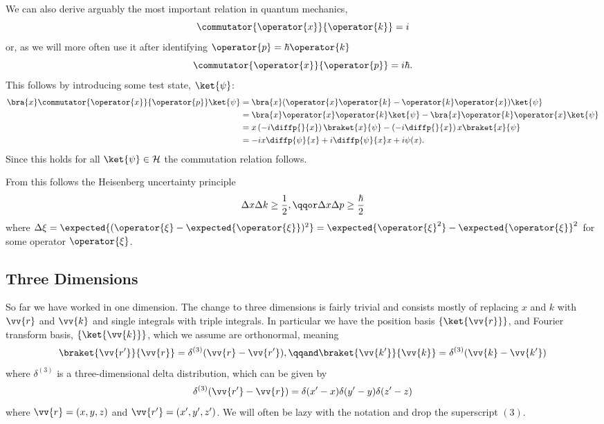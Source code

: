 \documentclass[fleqn]{NotesClass}
\newcommand*{\hilbert}{\mathcal{H}}
\begin{document}
    We can also derive arguably the most important relation in quantum mechanics,
    \begin{equation}
        \commutator{\operator{x}}{\operator{k}} = i
    \end{equation}
    or, as we will more often use it after identifying \(\operator{p} = \hbar\operator{k}\)
    \begin{equation}
        \commutator{\operator{x}}{\operator{p}} = i\hbar.
    \end{equation}
    This follows by introducing some test state, \(\ket{\psi}\):
    \begin{align}
        \bra{x}\commutator{\operator{x}}{\operator{p}}\ket{\psi} &= \bra{x}(\operator{x}\operator{k} - \operator{k}\operator{x})\ket{\psi}\\
        &= \bra{x}\operator{x}\operator{k}\ket{\psi} - \bra{x}\operator{k}\operator{x}\ket{\psi}\\
        &= x\left( -i\diffp{}{x} \right)\braket{x}{\psi} - \left( -i\diffp{}{x} \right)x\braket{x}{\psi}\\
        &= -ix\diffp{\psi}{x} + i\diffp{\psi}{x}x + i\psi(x).
    \end{align}
    Since this holds for all \(\ket{\psi} \in \hilbert\) the commutation relation follows.
    
    From this follows the Heisenberg uncertainty principle
    \begin{equation}
        \Delta x \Delta k \ge \frac{1}{2}, \qqor \Delta x \Delta p \ge \frac{\hbar}{2}
    \end{equation}
    where \(\Delta\xi = \expected{(\operator{\xi} - \expected{\operator{\xi}})^2} = \expected{\operator{\xi}^2} - \expected{\operator{\xi}}^2\) for some operator \(\operator{\xi}\).
    
    \subsection{Three Dimensions}
    So far we have worked in one dimension.
    The change to three dimensions is fairly trivial and consists mostly of replacing \(x\) and \(k\) with \(\vv{r}\) and \(\vv{k}\) and single integrals with triple integrals.
    In particular we have the position basis \(\{\ket{\vv{r}}\}\), and Fourier transform basis, \(\{\ket{\vv{k}}\}\), which we assume are orthonormal, meaning
    \begin{equation}
        \braket{\vv{r'}}{\vv{r}} = \delta^{(3)}(\vv{r} - \vv{r'}), \qqand \braket{\vv{k'}}{\vv{k}} = \delta^{(3)}(\vv{k} - \vv{k'})
    \end{equation}
    where \(\delta^{(3)}\) is a three-dimensional delta distribution, which can be given by
    \begin{equation}
        \delta^{(3)}(\vv{r'} - \vv{r}) = \delta(x' - x)\delta(y' - y)\delta(z' - z)
    \end{equation}
    where \(\vv{r} = (x, y, z)\) and \(\vv{r'} = (x', y', z')\).
    We will often be lazy with the notation and drop the superscript \((3)\).
    
\end{document}
